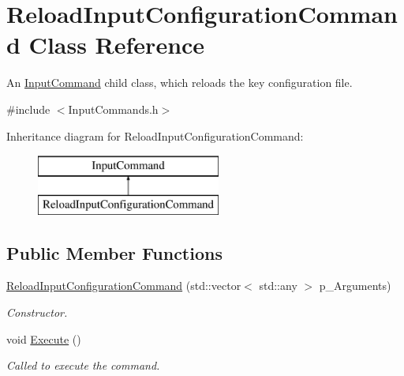 \hypertarget{class_reload_input_configuration_command}{}\section{Reload\+Input\+Configuration\+Command Class Reference}
\label{class_reload_input_configuration_command}


An \mbox{\hyperlink{class_input_command}{Input\+Command}} child class, which reloads the key configuration file.  




{\ttfamily \#include $<$Input\+Commands.\+h$>$}

Inheritance diagram for Reload\+Input\+Configuration\+Command\+:\begin{figure}[H]
\begin{center}
\leavevmode
\includegraphics[height=2.000000cm]{class_reload_input_configuration_command}
\end{center}
\end{figure}
\subsection*{Public Member Functions}
\begin{DoxyCompactItemize}
\item 
\mbox{\hyperlink{class_reload_input_configuration_command_ac1308f863b0a18e934fa246db5cc05d8}{Reload\+Input\+Configuration\+Command}} (std\+::vector$<$ std\+::any $>$ p\+\_\+\+Arguments)
\begin{DoxyCompactList}\small\item\em Constructor. \end{DoxyCompactList}\item 
\mbox{\label{class_reload_input_configuration_command_ab454a1eeeebe5887ce66fe56923b5b66}} 
void \mbox{\hyperlink{class_reload_input_configuration_command_ab454a1eeeebe5887ce66fe56923b5b66}{Execute}} ()
\begin{DoxyCompactList}\small\item\em Called to execute the command. \end{DoxyCompactList}\end{DoxyCompactItemize}

